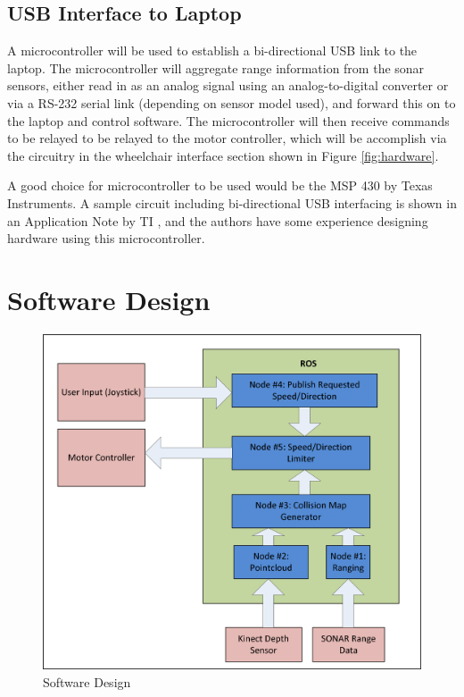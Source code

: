 \documentclass[oneside,final,a4paper]{report}
\begin{document}
\subsection{USB Interface to Laptop}
A microcontroller will be used to establish a bi-directional USB link to the laptop. The microcontroller will aggregate range information from the sonar sensors, either read in as an analog signal using an analog-to-digital converter or via a RS-232 serial link (depending on sensor model used), and forward this on to the laptop and control software. The microcontroller will then receive commands to be relayed to be relayed to the motor controller, which will be accomplish via the circuitry in the wheelchair interface section shown in Figure \ref{fig:hardware}.

A good choice for microcontroller to be used would be the MSP 430 by Texas Instruments. A sample circuit including bi-directional USB interfacing is shown in an Application Note by TI \cite{MSP430_USB}, and the authors have some experience designing hardware using this microcontroller.

\section{Software Design}
\begin{figure}[hbt]
 \centering
 \includegraphics[scale=0.9]{Software_Diagram}
 \caption{Software Design}\label{fig:software}
\end{figure}
\end{document}

